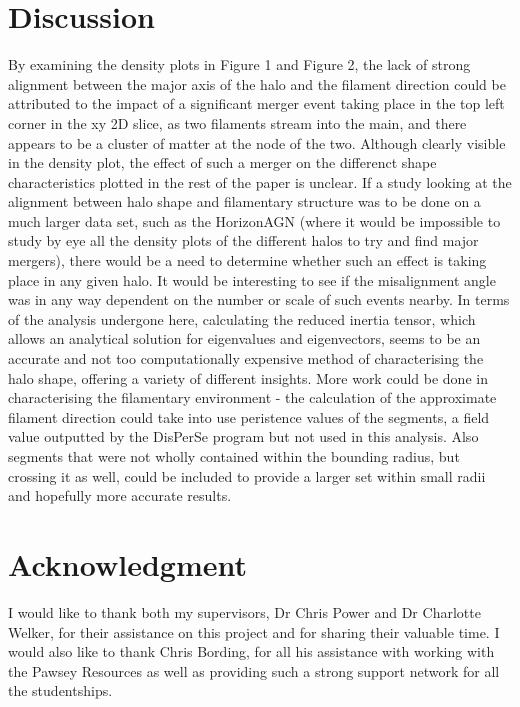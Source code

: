 \documentclass[journal]{IEEEtran}
\begin{document}
\section{Discussion}
By examining the density plots in Figure 1 and Figure 2, the lack of strong alignment between the major axis of the halo and the filament direction could be attributed to the impact of a significant merger event taking place in the top left corner in the xy 2D slice, as two filaments stream into the main, and there appears to be a cluster of matter at the node of the two. Although clearly visible in the density plot, the effect of such a merger on the differenct shape characteristics plotted in the rest of the paper is unclear. If a study looking at the alignment between halo shape and filamentary structure was to be done on a much larger data set, such as the HorizonAGN (where it would be impossible to study by eye all the density plots of the different halos to try and find major mergers), there would be a need to determine whether such an effect is taking place in any given halo. It would be interesting to see if the misalignment angle was in any way dependent on the number or scale of such events nearby. 
In terms of the analysis undergone here, calculating the reduced inertia tensor, which allows an analytical solution for eigenvalues and eigenvectors, seems to be an accurate and not too computationally expensive method of characterising the halo shape, offering a variety of different insights. More work could be done in characterising the filamentary environment - the calculation of the approximate filament direction could take into use peristence values of the segments, a field value outputted by the DisPerSe program but not used in this analysis. Also segments that were not wholly contained within the bounding radius, but crossing it as well, could be included to provide a larger set within small radii and hopefully more accurate results. 

\section*{Acknowledgment}
I would like to thank both my supervisors, Dr Chris Power and Dr Charlotte Welker, for their assistance on this project and for sharing their valuable time. I would also like to thank Chris Bording, for all his assistance with working with the Pawsey Resources as well as providing such a strong support network for all the studentships. 

\appendices
\end{document}
